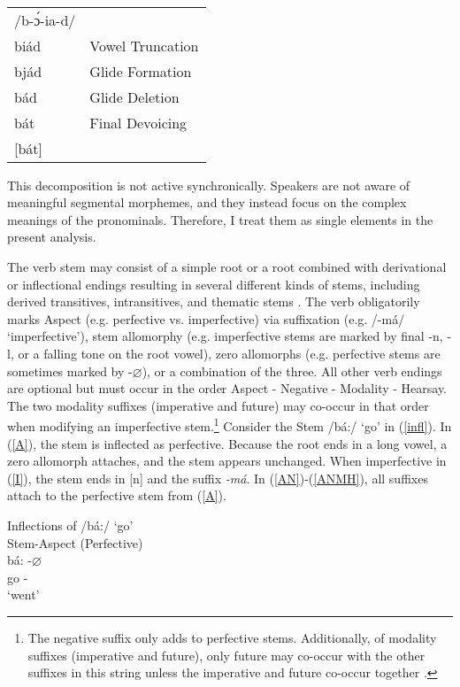 \documentclass[output=paper]{langscibook}
\begin{document}
 \citep[][41---42]{Watkins:1984} \label{pronominalderiv} \\
\begin{tabular}{ll}
     {/b-\'{ɔ}-ia-d/} & \\
     biád & Vowel Truncation \\
     bjád & Glide Formation \\
     bád & Glide Deletion \\
     bát & Final Devoicing \\
     {[bát]} & \\
\end{tabular}
\z

This decomposition is not active synchronically. Speakers are not aware of meaningful segmental morphemes, and they instead focus on the complex meanings of the pronominals. Therefore, I treat them as single elements in the present analysis.

The verb stem may consist of a simple root or a root combined with derivational or inflectional endings resulting in several different kinds of stems, including derived transitives, intransitives, and thematic stems \citep[][]{Watkins:1984}. The verb obligatorily marks Aspect (e.g. perfective vs. imperfective) via suffixation (e.g. /-má/ `imperfective'), stem allomorphy (e.g. imperfective stems are marked by final -n, -l, or a falling tone on the root vowel), zero allomorphs (e.g. perfective stems are sometimes marked by -$\varnothing$), or a combination of the three. All other verb endings are optional but must occur in the order Aspect - Negative - Modality - Hearsay. The two modality suffixes (imperative and future) may co-occur in that order when modifying an imperfective stem.\footnote{The negative suffix only adds to perfective stems. Additionally, of modality suffixes (imperative and future), only future may co-occur with the other suffixes in this string unless the imperative and future co-occur together \citep[][]{Watkins:1984}.} Consider the Stem /bá:/ `go' in (\ref{infl}). In (\ref{A}), the stem is inflected as perfective. Because the root ends in a long vowel, a zero allomorph attaches, and the stem appears unchanged. When imperfective in (\ref{I}), the stem ends in [n] and the suffix \textit{-má}. In (\ref{AN})-(\ref{ANMH}), all suffixes attach to the perfective stem from (\ref{A}).

\ea Inflections of /bá:/ `go' \label{infl} \\
\ea Stem-Aspect (Perfective) \label{A}\\
\gll bá: -$\varnothing$\\
go -{\Pfv}\\
\trans `went'
\end{document}
